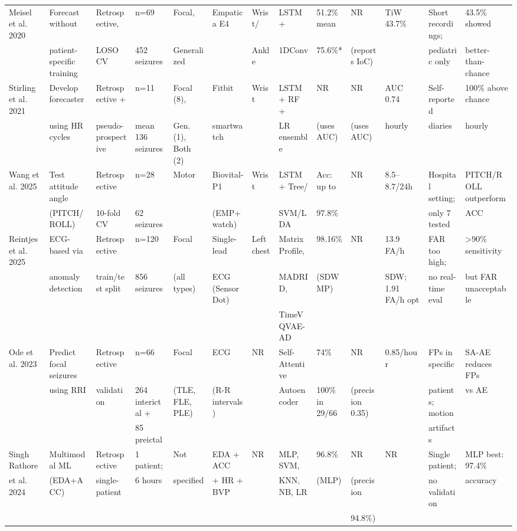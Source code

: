 \documentclass[10pt,a4paper]{article}
\begin{document}
\begin{longtable}{p{2.5cm}p{2cm}p{2cm}p{1.8cm}p{2cm}p{2cm}p{1.2cm}p{2.5cm}p{1.5cm}p{1.5cm}p{1.5cm}p{2cm}p{2.5cm}}
Meisel et al. 2020 & Forecast without & Retrospective, & n=69 & Focal, & Empatica E4 & Wrist/ & LSTM + & 51.2\% mean & NR & TiW 43.7\% & Short recordings; & 43.5\% showed \\[2pt]
& patient-specific training & LOSO CV & 452 seizures & Generalized & & Ankle & 1DConv & 75.6\%* & (reports IoC) & & pediatric only & better-than-chance \\[6pt]

Stirling et al. 2021 & Develop forecaster & Retrospective + & n=11 & Focal (8), & Fitbit & Wrist & LSTM + RF + & NR & NR & AUC 0.74 & Self-reported & 100\% above chance \\[2pt]
& using HR cycles & pseudo-prospective & mean 136 seizures & Gen. (1), Both (2) & smartwatch & & LR ensemble & (uses AUC) & (uses AUC) & hourly & diaries & hourly \\[6pt]

Wang et al. 2025 & Test attitude angle & Retrospective & n=28 & Motor & Biovital-P1 & Wrist & LSTM + Tree/ & Acc: up to & NR & 8.5--8.7/24h & Hospital setting; & PITCH/ROLL outperform \\[2pt]
& (PITCH/ROLL) & 10-fold CV & 62 seizures & & (EMP+watch) & & SVM/LDA & 97.8\% & & & only 7 tested & ACC \\[6pt]

Reintjes et al. 2025 & ECG-based via & Retrospective & n=120 & Focal & Single-lead & Left chest & Matrix Profile, & 98.16\% & NR & 13.9 FA/h & FAR too high; & >90\% sensitivity \\[2pt]
& anomaly detection & train/test split & 856 seizures & (all types) & ECG (Sensor Dot) & & MADRID, & (SDW MP) & & SDW; 1.91 FA/h opt & no real-time eval & but FAR unacceptable \\[2pt]
& & & & & & & TimeVQVAE-AD & & & & \\[6pt]

Ode et al. 2023 & Predict focal seizures & Retrospective & n=66 & Focal & ECG & NR & Self-Attentive & 74\% & NR & 0.85/hour & FPs in specific & SA-AE reduces FPs \\[2pt]
& using RRI & validation & 264 interictal + & (TLE, FLE, PLE) & (R-R intervals) & & Autoencoder & 100\% in 29/66 & (precision 0.35) & & patients; motion & vs AE \\[2pt]
& & & 85 preictal & & & & & & & & artifacts \\[6pt]

Singh Rathore & Multimodal ML & Retrospective & 1 patient; & Not & EDA + ACC & NR & MLP, SVM, & 96.8\% & NR & NR & Single patient; & MLP best: 97.4\% \\[2pt]
et al. 2024 & (EDA+ACC) & single-patient & 6 hours & specified & + HR + BVP & & KNN, NB, LR & (MLP) & (precision & & no validation & accuracy \\[2pt]
& & & & & & & & & 94.8\%) & & \\[6pt]


\end{longtable}
\end{document}
